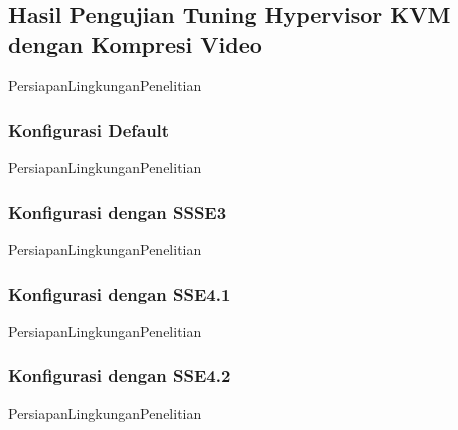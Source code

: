 \chapter{\babEmpat}

\section{Hasil Pengujian Tuning Hypervisor KVM dengan Kompresi Video}
PersiapanLingkunganPenelitian

\subsection{Konfigurasi Default}
PersiapanLingkunganPenelitian

\subsection{Konfigurasi dengan SSSE3}
PersiapanLingkunganPenelitian

\subsection{Konfigurasi dengan SSE4.1}
PersiapanLingkunganPenelitian

\subsection{Konfigurasi dengan SSE4.2}
PersiapanLingkunganPenelitian

